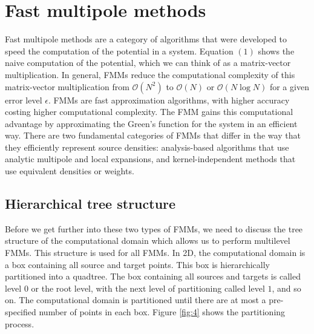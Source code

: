 \documentclass[11pt, oneside]{article}   	%
\begin{document}
\section{Fast multipole methods}
Fast multipole methods are a category of algorithms that were developed to speed the computation of the potential in a system. Equation $(1)$ shows the naive computation of the potential, which we can think of as a matrix-vector multiplication. In general, FMMs reduce the computational complexity of this matrix-vector multiplication from $\mathcal{O}(N^2)$ to $\mathcal{O}(N)$ or $\mathcal{O}(N\log N)$ for a given error level $\epsilon$. FMMs are fast approximation algorithms, with higher accuracy costing higher computational complexity. The FMM gains this computational advantage by approximating the Green's function for the system in an efficient way. There are two fundamental categories of FMMs that differ in the way that they efficiently represent source densities: analysis-based algorithms that use analytic multipole and local expansions, and kernel-independent methods that use equivalent densities or weights.

\subsection{Hierarchical tree structure}
Before we get further into these two types of FMMs, we need to discuss the tree structure of the computational domain which allows us to perform multilevel FMMs. This structure is used for all FMMs. In 2D, the computational domain is a box containing all source and target points. This box is hierarchically partitioned into a quadtree. The box containing all sources and targets is called level $0$ or the root level, with the next level of partitioning called level $1$, and so on. The computational domain is partitioned until there are at most a pre-specified number of points in each box. Figure \ref{fig:4} shows the partitioning process.
\end{document}
